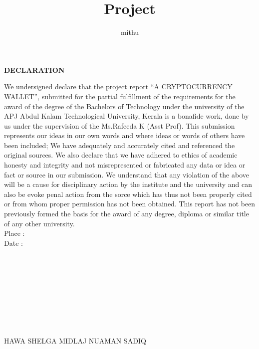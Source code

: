 \documentclass[12pt]{article}
\title{Project}
\author{mithu}
\date{ }
\begin{document}
\newenvironment{changemargin}[3]{%
\begin{list}{}{%
\setlength{\topsep}{0pt}%
\setlength{\leftmargin}{#1}%
\setlength{\rightmargin}{#2}%
\setlength{\listparindent}{\parindent}%
\setlength{\itemindent}{\parindent}%
\setlength{\parsep}{\parskip}%
}%
\item[]}{\end{list}
}

\newenvironment{boxed}[1]
    {
      
    }







\newpage

\begin{boxed}{Title of the Box}


\vspace*{30px}
\begin{center}\LARGE\bf{DECLARATION}\end{center}

We undersigned declare that the project report “A CRYPTOCURRENCY WALLET”, submitted for the partial fulfillment of the requirements for
the award of the degree of the Bachelors of Technology under the university of
the APJ Abdul Kalam Technological University, Kerala is a bonafide work,
done by us under the supervision of the Ms.Rafeeda K (Asst Prof). This
submission represents our ideas in our own words and where ideas or words
of others have been included; We have adequately and accurately cited and
referenced the original sources. We also declare that we have adhered to ethics
of academic honesty and integrity and not misrepresented or fabricated any
data or idea or fact or source in our submission. We understand that any
violation of the above will be a cause for disciplinary action by the
institute and the university and can also be evoke penal action from the sorce
which has thus not been properly cited or from whom proper permission has
not been obtained. This report has not been previously formed the basis for
the award of any degree, diploma or similar title of any other university.
\\Place :
\\Date :
\\
\\
\\
\\
\\
\\
\\
\\
\\
\\
 HAWA \hspace{1.7mm}SHELGA \hspace{1.7mm}  MIDLAJ\hspace{1.7mm}  NUAMAN SADIQ



\end{boxed}
\end{document}
